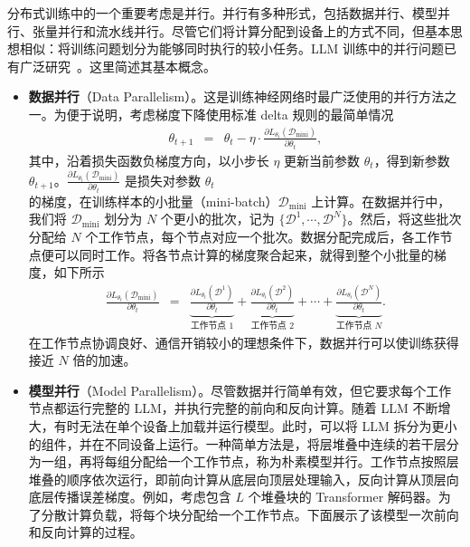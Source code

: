 分布式训练中的一个重要考虑是并行。并行有多种形式，包括数据并行、模型并行、张量并行和流水线并行。尽管它们将计算分配到设备上的方式不同，但基本思想相似：将训练问题划分为能够同时执行的较小任务。LLM 训练中的并行问题已有广泛研究~\cite{narayanan-etal:2021efficient,fedus-etal:2022switch}。这里简述其基本概念。

\begin{itemize}
\item \vspace{0.5em} \textbf{数据并行}（Data Parallelism）。这是训练神经网络时最广泛使用的并行方法之一。为便于说明，考虑梯度下降使用标准 delta 规则的最简单情况
    \begin{eqnarray}
    \theta_{t+1} & = & \theta_{t} - \eta \cdot \frac{\partial L_{\theta_t}(\mathcal{D}_{\mathrm{mini}})}{\partial \theta_t},
    \end{eqnarray}
    \noindent 其中，沿着损失函数负梯度方向，以小步长 $\eta$ 更新当前参数 $\theta_{t}$，得到新参数 $\theta_{t+1}$。$\frac{\partial L_{\theta_t}(\mathcal{D}_{\mathrm{mini}})}{\partial \theta_t}$ 是损失对参数 $\theta_t$ 的梯度，在训练样本的小批量（mini-batch）$\mathcal{D}_{\mathrm{mini}}$ 上计算。在数据并行中，我们将 $\mathcal{D}_{\mathrm{mini}}$ 划分为 $N$ 个更小的批次，记为 $\{\mathcal{D}^{1},\cdots,\mathcal{D}^{N}\}$。然后，将这些批次分配给 $N$ 个工作节点，每个节点对应一个批次。数据分配完成后，各工作节点便可以同时工作。将各节点计算的梯度聚合起来，就得到整个小批量的梯度，如下所示
    \begin{eqnarray}
    \frac{\partial L_{\theta_t}(\mathcal{D}_{\mathrm{mini}})}{\partial \theta_t} & = & \underbrace{\frac{\partial L_{\theta_t}(\mathcal{D}^{1})}{\partial \theta_t}}_{\textrm{工作节点 1}} + \underbrace{\frac{\partial L_{\theta_t}(\mathcal{D}^{2})}{\partial \theta_t}}_{\textrm{工作节点 2}} + \cdots + \underbrace{\frac{\partial L_{\theta_t}(\mathcal{D}^{N})}{\partial \theta_t}}_{\textrm{工作节点 $N$}}.
    \end{eqnarray}
    在工作节点协调良好、通信开销较小的理想条件下，数据并行可以使训练获得接近 $N$ 倍的加速。
\item \vspace{0.3em} \textbf{模型并行}（Model Parallelism）。尽管数据并行简单有效，但它要求每个工作节点都运行完整的 LLM，并执行完整的前向和反向计算。随着 LLM 不断增大，有时无法在单个设备上加载并运行模型。此时，可以将 LLM 拆分为更小的组件，并在不同设备上运行。一种简单方法是，将层堆叠中连续的若干层分为一组，再将每组分配给一个工作节点，称为朴素模型并行。工作节点按照层堆叠的顺序依次运行，即前向计算从底层向顶层处理输入，反向计算从顶层向底层传播误差梯度。例如，考虑包含 $L$ 个堆叠块的 Transformer 解码器。为了分散计算负载，将每个块分配给一个工作节点。下面展示了该模型一次前向和反向计算的过程。


\end{itemize}
